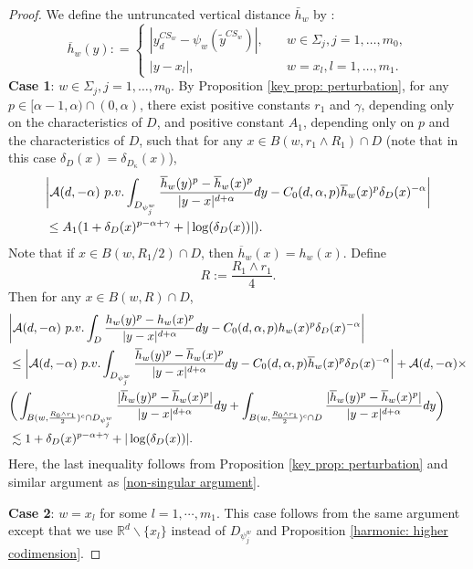 \documentclass[10pt,a4paper]{amsart}
\newcommand{\Si}{\Sigma}
\newcommand{\ga}{\gamma}
\newcommand{\mb}{\mathbb}
\newcommand{\wt}{\widetilde}
\begin{document}
\begin{proof}
We define the untruncated vertical distance $\bar{h}_w$ by :
\begin{equation}
\overline{h}_w(y): = 
\begin{cases}
|y_d^{CS_{w}} - \psi_w(\wt y^{CS_{w}})|, & \quad w \in \Si_j, j=1, \dots, m_0,\\
|y - x_l|, & \quad w= x_l, l=1, \dots, m_1.
\end{cases}
\end{equation}
\textbf{Case 1}: $w \in \Si_j, j=1, \dots, m_0$. 
By Proposition \ref{key prop: perturbation}, for any $p \in [\alpha - 1, \alpha) \cap (0, \alpha)$, there exist positive constants 
$r_1$ and $\ga$, depending only on the characteristics of $D$, and positive constant $A_1$, depending only on $p$ and the characteristics of $D$,
such that for any $x \in B(w,r_1\wedge R_1) \cap D$ (note that in this case $\delta_D(x) = \delta_{D_\kappa}(x)$),
\begin{align*}
& \bigg|\mathcal{A}(d,-\alpha){\ \rm p.v.}\int_{D_{\psi_j^w}} \frac{\overline{h}_w(y)^{p}-\overline{h}_w(x)^{p}}{|y-x|^{d+\alpha}}dy - C_0(d,\alpha, p) \overline{h}_w(x)^p \delta_{D}(x)^{- \alpha}\bigg| \\
&\le A_1(1+ \delta_{D}(x)^{p-\alpha+\gamma} + |\log(\delta_{D}(x))|).
\end{align*}
Note that if  $x \in B(w,R_1/2)\cap D$, then $\overline{h}_w(x) = h_w(x)$. 
Define $$R:= \frac{R_1\wedge r_1}{4}.$$
Then for any $x \in B(w,R)\cap D$,
\begin{align*}
& \bigg|\mathcal{A}(d,-\alpha){\ \rm p.v.}\int_{D} \frac{h_w(y)^{p}-h_w(x)^{p}}{|y-x|^{d+\alpha}}dy - C_0(d,\alpha,p) h_w(x)^p \delta_{D}(x)^{- \alpha}\bigg| \\
& \le \bigg|\mathcal{A}(d,-\alpha){\ \rm p.v.}\int_{D_{\psi_j^w}} \frac{\overline h_w(y)^{p}-\overline h_w(x)^{p}}{|y-x|^{d+\alpha}}dy - C_0(d,\alpha,p) \overline h_w(x)^p \delta_{D}(x)^{- \alpha}\bigg| + \mathcal{A}(d,-\alpha) \times \\
& \bigg( \int_{B(w,\frac{R_0 \wedge r_1}{2})^c \cap D_{\psi_j^w}} \frac{|\overline h_w(y)^{p}-\overline h_w(x)^{p}|}{|y-x|^{d+\alpha}}dy + \int_{B(w,\frac{R_0 \wedge r_1}{2})^c\cap D} \frac{|\overline h_w(y)^{p}-\overline h_w(x)^{p}|}{|y-x|^{d+\alpha}}dy \bigg) \\
& \lesssim 1+ \delta_D(x)^{p-\alpha +\gamma} + |\log (\delta_D(x))|.
\end{align*}
Here, the last inequality follows from Proposition \ref{key prop: perturbation} and similar argument as \eqref{non-singular argument}. 

\noindent \textbf{Case 2}: $w = x_l$ for some $l = 1,\cdots,m_1$. This case follows from the same argument except that we use $\mb R^d \backslash \{x_l\}$ instead of $D_{\psi_j^w}$ and Proposition \ref{harmonic: higher codimension}.
\end{proof}
\end{document}

